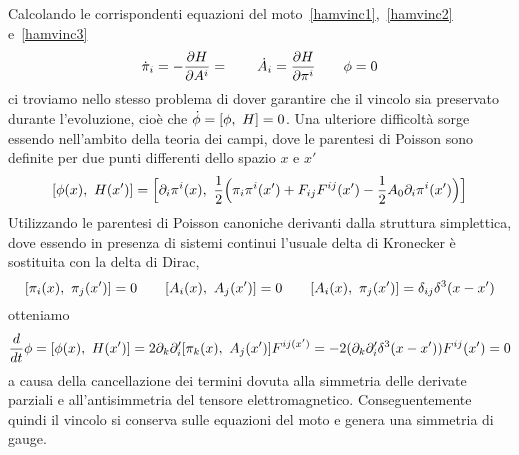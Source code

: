     Calcolando le corrispondenti equazioni del moto~\eqref{hamvinc1},~\eqref{hamvinc2} e~\eqref{hamvinc3} 
\begin{equation*}
    \dot \pi_i = - \frac{\partial H}{\partial A^i} = \qquad \dot A_i = \frac{\partial H}{\partial\pi^i} \qquad \phi = 0
\end{equation*}
    ci troviamo nello stesso problema di dover garantire che il vincolo sia preservato durante l'evoluzione, cioè che $\dot \phi = [\phi, ~H] = 0$. Una ulteriore difficoltà sorge essendo nell'ambito della teoria dei campi, dove le parentesi di Poisson sono definite per due punti differenti dello spazio $x$ e $x'$
\begin{equation*}
    [\phi(x), ~H(x')] = \Big[\partial_i \pi^i (x), ~ \frac{1}{2} \Big( \pi_i \pi^i (x') + F_{ij} F^{ij}(x') - \frac{1}{2} A_0 \partial_i \pi^i (x') \Big) \Big]
\end{equation*}
    Utilizzando le parentesi di Poisson canoniche derivanti dalla struttura simplettica, dove essendo in presenza di sistemi continui l'usuale delta di Kronecker è sostituita con la delta di Dirac,
\begin{equation*}
    [\pi_i(x), ~\pi_j(x')] = 0 \qquad [A_i(x), ~A_j(x')] = 0 \qquad [A_i(x), ~\pi_j(x')] = \delta_{ij} \delta^3(x - x')
\end{equation*}
    otteniamo 
\begin{equation*}
    \frac{d}{dt} \phi = [\phi(x), ~H(x')] = 2 \partial_k \partial'_i [\pi_k(x), ~A_j(x')] F^{ij(x')} = -2(\partial_k \partial'_i \delta^3(x - x')) F^{ij} (x') = 0
\end{equation*}
    a causa della cancellazione dei termini dovuta alla simmetria delle derivate parziali e all'antisimmetria del tensore elettromagnetico. Conseguentemente quindi il vincolo si conserva sulle equazioni del moto e genera una simmetria di gauge.
    
